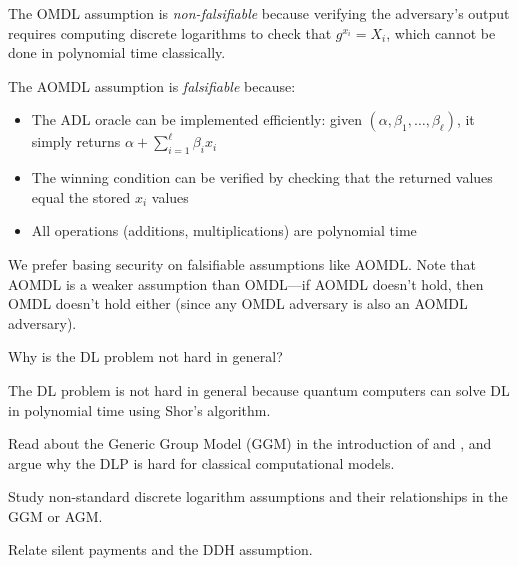 \ifsolutions
\begin{mysolution}
  The OMDL assumption is \emph{non-falsifiable} because verifying the adversary's output requires computing discrete logarithms to check that $g^{x_i} = X_i$, which cannot be done in polynomial time classically.

  The AOMDL assumption is \emph{falsifiable} because:
  \begin{itemize}
    \item The ADL oracle can be implemented efficiently: given $(\alpha, \beta_1, \ldots, \beta_\ell)$, it simply returns $\alpha + \sum_{i=1}^\ell \beta_i x_i$
    \item The winning condition can be verified by checking that the returned values equal the stored $x_i$ values
    \item All operations (additions, multiplications) are polynomial time
  \end{itemize}

  We prefer basing security on falsifiable assumptions like AOMDL. Note that AOMDL is a weaker assumption than OMDL---if AOMDL doesn't hold, then OMDL doesn't hold either (since any OMDL adversary is also an AOMDL adversary).
\end{mysolution}
\fi

\begin{exercise}[Optional]
  Why is the DL problem not hard in general?
\end{exercise}

\ifsolutions
\begin{mysolution}
  The DL problem is not hard in general because quantum computers can solve DL in polynomial time using Shor's algorithm.
\end{mysolution}
\fi

\begin{exercise}[Optional]
  Read about the Generic Group Model (GGM) in the introduction of \textcite{Shoup97} and \textcite{Maurer05}, and argue why the DLP is hard for classical computational models.
\end{exercise}

\begin{exercise}[Optional]
  Study non-standard discrete logarithm assumptions and their relationships in the GGM or AGM.
\end{exercise}

\begin{exercise}[Optional]
  Relate silent payments and the DDH assumption.
\end{exercise}
